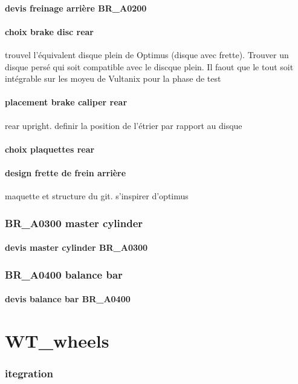 			\paragraph{devis freinage arrière BR\_A0200} 
			\paragraph{choix brake disc rear} trouvel l'équivalent disque plein de Optimus (disque avec frette). Trouver un disque persé qui soit compatible avec le discque plein. Il faout que le tout soit intégrable sur les moyeu de Vultanix pour la phase de test
			\paragraph{placement brake caliper rear} rear upright. definir la position de l'étrier par rapport au disque
			\paragraph{choix plaquettes rear} 
			\paragraph{design frette de frein arrière} maquette et structure du git. s'inspirer d'optimus
		\subsubsection*{BR\_A0300 master cylinder} 
 \par 
			\paragraph{devis master cylinder BR\_A0300} 
		\subsubsection*{BR\_A0400 balance bar} 
 \par 
			\paragraph{devis balance bar BR\_A0400} 
\newpage 
 \section*{WT\_wheels} 
 \par 
		\subsubsection*{itegration} 
 \par 
